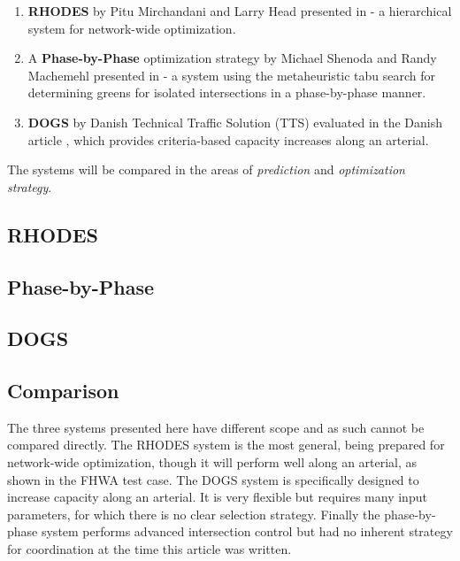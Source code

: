 \begin{enumerate}
\item \textbf{RHODES} by Pitu Mirchandani and Larry Head presented in
\cite{44} - a hierarchical system for network-wide optimization.

\item A \textbf{Phase-by-Phase} optimization strategy by Michael
Shenoda and Randy Machemehl presented in \cite{1} - a system using the
metaheuristic tabu search for determining greens for isolated
intersections in a phase-by-phase manner.

\item \textbf{DOGS} by Danish Technical Traffic Solution (TTS)
evaluated in the Danish article \cite{dogs}, which provides
criteria-based capacity increases along an arterial.

\end{enumerate}

The systems will be compared in the areas of \textit{prediction} and
\textit{optimization strategy}.

\subsection{RHODES}


\subsection{Phase-by-Phase}


\subsection{DOGS}


\subsection{Comparison}

The three systems presented here have different scope and as such
cannot be compared directly. The RHODES system is the most general,
being prepared for network-wide optimization, though it will perform
well along an arterial, as shown in the FHWA test case. The DOGS
system is specifically designed to increase capacity along an
arterial. It is very flexible but requires many input parameters, for
which there is no clear selection strategy. Finally the phase-by-phase
system performs advanced intersection control but had no inherent
strategy for coordination at the time this article was written.

